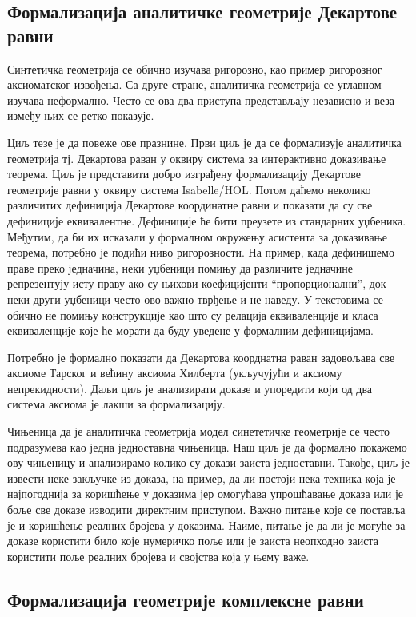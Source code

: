 \documentclass[11pt]{article}
\begin{document}
\subsection{Формализација аналитичке геометрије Декартове равни}

Синтетичка геометрија се обично изучава ригорозно, као пример
ригорозног аксиоматског извођења. Са друге стране, аналитичка
геометрија се углавном изучава неформално. Често се ова два приступа
представљају независно и веза између њих се ретко показује.

Циљ тезе је да повеже ове празнине. Први циљ је да се формализује
аналитичка геометрија тј. Декартова раван у оквиру система за
интерактивно доказивање теорема. Циљ је пре\-дста\-ви\-ти добро изграђену
формализацију Декартове геометрије равни у оквиру система
Isabelle/HOL. Потом даћемо неколико различитих дефиниција Декартове
координатне равни и показати да су све дефиниције
еквивалентне. Дефиниције ће бити преузете из стандарних уџбеника.
Међутим, да би их исказали у формалном окружењу асистента за
доказивање теорема, потребно је подићи ниво ригорозности. На пример,
када дефинишемо праве преко једначина, неки уџбеници помињу да
различите једначине репрезентују исту праву ако су њихови коефицијенти
``про\-по\-рцио\-на\-лни'', док неки други уџбеници често ово важно тврђење и
не наведу. У текстовима се обично не помињу конструкције као што су
релација еквиваленције и класа еквиваленције које ће морати да буду
уведене у формалним дефиницијама.

Потребно је формално показати да Декартова коорднатна раван задовољава
све аксиоме Тарског и већину аксиома Хилберта (укључујући и аксиому
непрекидности). Даљи циљ је анализирати доказе и упоредити који од два
система аксиома је лакши за формализацију.

Чињеница да је аналитичка геометрија модел синететичке геометрије се
често подразумева као једна једноставна чињеница. Наш циљ је да
формално покажемо ову чињеницу и ана\-ли\-зи\-ра\-мо колико су докази заиста
једноставни. Такође, циљ је извести неке закључке из доказа, на
пример, да ли постоји нека техника која је најпогоднија за коришћење у
доказима јер омогућава упрошћавање доказа или је боље све доказе
изводити директним приступом. Важно питање које се поставља је и
коришћење реалних бројева у доказима. Наиме, питање је да ли је могуће
за доказе користити било које нумеричко поље или је заиста неопходно
заиста користити поље реалних бројева и својства која у њему важе.

\subsection{Формализација геометрије комплексне равни}
\end{document}
